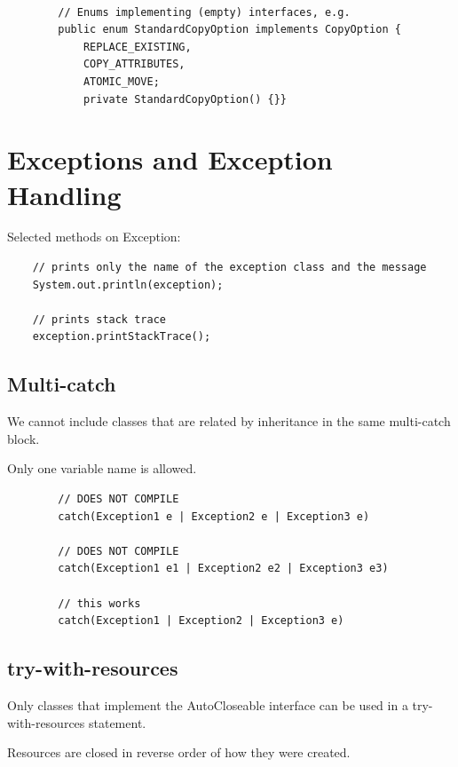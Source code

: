\documentclass{scrartcl}
\begin{document}
    \begin{lstlisting}

        // Enums implementing (empty) interfaces, e.g.
        public enum StandardCopyOption implements CopyOption {
            REPLACE_EXISTING,
            COPY_ATTRIBUTES,
            ATOMIC_MOVE;
            private StandardCopyOption() {}}

    \end{lstlisting}

\section{Exceptions and Exception Handling}

Selected methods on Exception:

\begin{lstlisting}
    // prints only the name of the exception class and the message
    System.out.println(exception);

    // prints stack trace
    exception.printStackTrace();

\end{lstlisting}


\subsection{Multi-catch}

We cannot include classes that are related by inheritance in the same multi-catch block.

Only one variable name is allowed.

    \begin{lstlisting}
        // DOES NOT COMPILE
        catch(Exception1 e | Exception2 e | Exception3 e)

        // DOES NOT COMPILE
        catch(Exception1 e1 | Exception2 e2 | Exception3 e3)

        // this works
        catch(Exception1 | Exception2 | Exception3 e)
    \end{lstlisting}

\subsection{try-with-resources}

    Only classes that implement the AutoCloseable interface can be used in a try-with-resources statement.

    Resources are closed in reverse order of how they were created.
\end{document}
